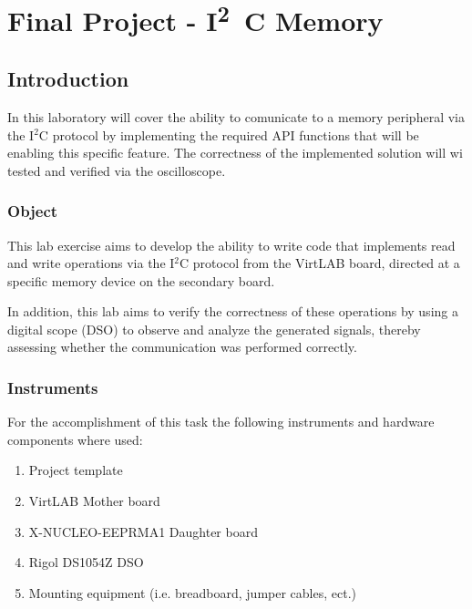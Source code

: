 \documentclass[../main.tex]{subfiles}
\begin{document}
\clearpage
\thispagestyle{empty}

\vspace*{7cm}
\section{Final Project - \unit{I^2C} Memory}
\vspace*{1.5cm}


\subsection{Introduction}

In this laboratory will cover the ability to comunicate to a memory peripheral via the I$^2$C protocol by implementing the required API functions that will be enabling this specific feature. The correctness of the implemented solution will wi tested and verified via the oscilloscope.

\subsubsection*{Object}

This lab exercise aims to develop the ability to write code that implements read and write operations via the I$^2$C protocol from the VirtLAB board, directed at a specific memory device on the secondary board.

In addition, this lab aims to verify the correctness of these operations by using a digital scope (DSO) to observe and analyze the generated signals, thereby assessing whether the communication was performed correctly.

\subsubsection*{Instruments} 

For the accomplishment of this task the following instruments and hardware components where used:

\begin{enumerate}[label=\textbf{-}]
	\item Project template
	\item VirtLAB Mother board
	\item X-NUCLEO-EEPRMA1 Daughter board
	\item Rigol DS1054Z DSO
	\item Mounting equipment (i.e. breadboard, jumper cables, ect.)
\end{enumerate}
	
\end{document}
